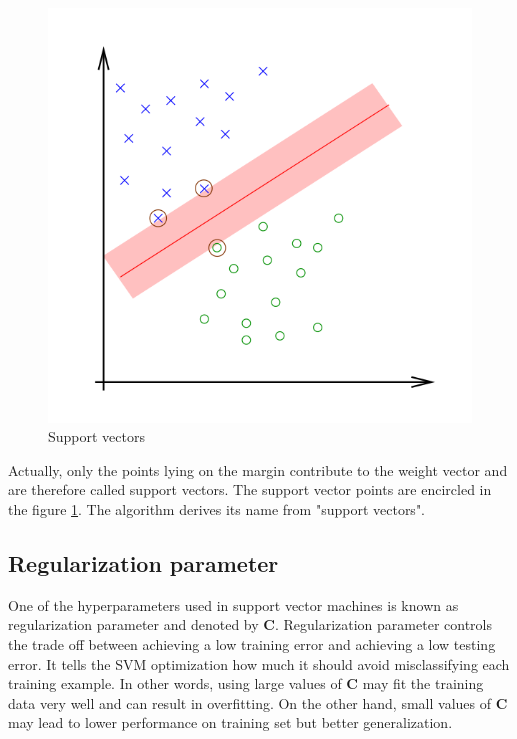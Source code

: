 \begin{figure}
\centering
\includegraphics[scale=0.4]{figures/SVMFigure3.png}
\caption{Support vectors}\label{fig:SVM3}
\end{figure}

Actually, only the points lying on the margin contribute to the weight vector and are therefore called support vectors. The support vector points are encircled in the figure \ref{fig:SVM3}. The algorithm derives its name from "support vectors".

\subsection{Regularization parameter} \label{subsec:RegPar}

One of the hyperparameters used in support vector machines is known as regularization parameter and denoted by $\mathbf{C}$. Regularization parameter controls the trade off between achieving a low training error and achieving a low testing error. It tells the SVM optimization how much it should avoid misclassifying each training example. In other words, using large values of $\mathbf{C}$ may fit the training data very well and can result in overfitting. On the other hand, small values of $\mathbf{C}$ may lead to lower performance on training set but better generalization.
